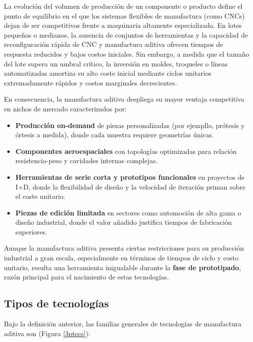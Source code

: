 La evolución del volumen de producción de un componente o producto define el punto de equilibrio en el que los sistemas flexibles de manufactura (como CNCs) dejan de ser competitivos frente a maquinaria altamente especializada. En lotes pequeños o medianos, la ausencia de conjuntos de herramientas y la capacidad de reconfiguración rápida de CNC y manufactura aditiva ofrecen tiempos de respuesta reducidos y bajos costos iniciales. Sin embargo, a medida que el tamaño del lote supera un umbral crítico, la inversión en moldes, troqueles o líneas automatizadas amortiza su alto coste inicial mediante ciclos unitarios extremadamente rápidos y costos marginales decrecientes.  

En consecuencia, la manufactura aditiva despliega su mayor ventaja competitiva en nichos de mercado caracterizados por:

\begin{itemize}
  \item \textbf{Producción on-demand} de piezas personalizadas (por ejempllo, prótesis y órtesis a medida), donde cada muestra requiere geometrías únicas.  
  \item \textbf{Componentes aeroespaciales} con topologías optimizadas para relación resistencia-peso y cavidades internas complejas.  
  \item \textbf{Herramientas de serie corta y prototipos funcionales} en proyectos de I+D, donde la flexibilidad de diseño y la velocidad de iteración priman sobre el coste unitario.  
  \item \textbf{Piezas de edición limitada} en sectores como automoción de alta gama o diseño industrial, donde el valor añadido justifica tiempos de fabricación superiores.
\end{itemize}  

Aunque la manufactura aditiva presenta ciertas restricciones para su producción industrial a gran escala, especialmente en términos de tiempos de ciclo y costo unitario, resulta una herramienta inigualable durante la \textbf{fase de prototipado}, razón principal para el nacimiento de estas tecnologías.

\subsection{Tipos de tecnologías}

Bajo la definición anterior, las familias generales de tecnologías de manufactura aditiva son (Figura \ref{3ptecs}):

